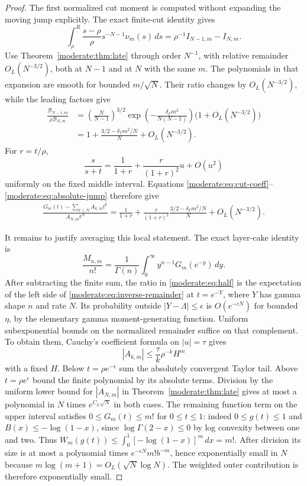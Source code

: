 \begin{proof}
The first normalized cut moment is computed without expanding the
moving jump explicitly. The exact finite-cut identity gives
\[
 \int_\rho^R\frac{s-\rho}{\rho}s^{-N-1}\nu_m(s)\,ds
   =\rho^{-1}I_{N-1,m}-I_{N,m}.
\]
Use Theorem~\ref{moderate:thm:late} through order $N^{-1}$, with
relative remainder $O_L(N^{-3/2})$, both at $N-1$ and at $N$ with
the same $m$. The polynomials in that expansion are smooth for bounded
$m/\sqrt N$. Their ratio changes by $O_L(N^{-3/2})$, while the leading
factors give
\begin{align*}
 \frac{\mathcal B_{N-1,m}}{\rho\mathcal B_{N,m}}
 &=\left(\frac{N}{N-1}\right)^{3/2}
    \exp\left(-\frac{\delta_\Gamma m^2}{N(N-1)}\right)
    \bigl(1+O_L(N^{-3/2})\bigr)\\
 &=1+\frac{3/2-\delta_\Gamma m^2/N}{N}
       +O_L(N^{-3/2}).
\end{align*}
For $r=t/\rho$,
\[
 \frac{s}{s+t}=\frac1{1+r}+
            \frac{r}{(1+r)^2}u+O(u^2)
\]
uniformly on the fixed middle interval. Equations
\eqref{moderate:eq:cut-coeff}--\eqref{moderate:eq:absolute-jump} therefore give
\begin{align}\label{moderate:eq:inverse-remainder}
 \frac{G_m(t)-\sum_{k<N}A_{k,m}t^k}{A_{N,m}t^N}
 =\frac1{1+r}+
 \frac{r}{(1+r)^2}\frac{3/2-\delta_\Gamma m^2/N}{N}
 +O_L(N^{-3/2}).
\end{align}

It remains to justify averaging this local statement. The exact
layer-cake identity is
\[
 \frac{M_{n,m}}{n!}=\frac1{\Gamma(n)}
       \int_0^\infty y^{n-1}G_m(e^{-y})\,dy.
\]
After subtracting the finite sum, the ratio in
\eqref{moderate:eq:half} is the expectation of the left side of
\eqref{moderate:eq:inverse-remainder} at $t=e^{-Y}$, where $Y$ has
gamma shape $n$ and rate $N$.
Its probability outside $|Y-\Lambda|\le\epsilon$ is $O(e^{-cN})$
for bounded $\eta$, by the elementary gamma moment-generating function.
Uniform subexponential bounds on the normalized remainder suffice on
that complement. To obtain them, Cauchy's coefficient formula on
$|u|=\tau$ gives
\[
 |A_{k,m}|\le\frac{\tau}{k}\rho^{-k}H^m
\]
with a fixed $H$. Below $t=\rho e^{-\epsilon}$ sum the absolutely
convergent Taylor tail. Above $t=\rho e^\epsilon$ bound the finite
polynomial by its absolute terms. Division by the uniform lower bound
for $|A_{N,m}|$ in Theorem~\ref{moderate:thm:late} gives at most a
polynomial in $N$ times $e^{C_L\sqrt N}$ in both cases.
The remaining function term on the upper interval satisfies
$0\le G_m(t)\le m!$ for $0\le t\le1$: indeed $0\le g(t)\le1$
and $B(x)\le-\log(1-x)$, since
$\log\Gamma(2-x)\le0$ by log convexity between one and two. Thus
$W_m(g(t))\le\int_0^1[-\log(1-x)]^m\,dx=m!$.
After division its size is
at most a polynomial times
$e^{-\epsilon N}m!b^{-m}$, hence exponentially small in $N$ because
$m\log(m+1)=O_L(\sqrt N\log N)$.
The weighted outer contribution is therefore exponentially small.


\end{proof}
